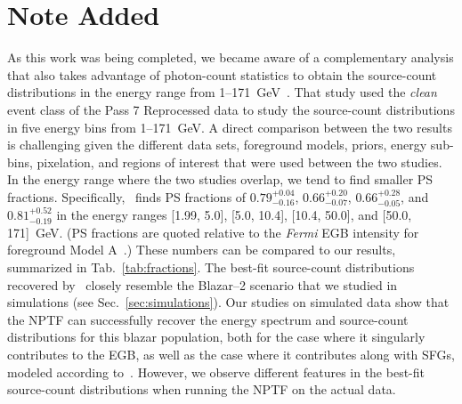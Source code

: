 \section*{Note Added}

As this work was being completed, we became aware of a complementary analysis that also takes advantage of photon-count statistics to obtain the source-count distributions in the energy range from 1--171~GeV~\cite{Zechlin:2016pme}.  That study used the {\it clean} event class of the Pass 7 Reprocessed data to study the source-count distributions in five energy bins from 1--171~GeV.  A direct comparison between the two results is challenging given the different data sets, foreground models, priors, energy sub-bins, pixelation, and regions of interest that were used between the two studies.  In the energy range where the two studies overlap, we tend to find smaller PS fractions.   %
Specifically,~\cite{Zechlin:2016pme} finds PS fractions of  $0.79_{-0.16}^{+0.04}$, $0.66_{-0.07}^{+0.20}$, $0.66_{-0.05}^{+0.28}$, and $0.81_{-0.19}^{+0.52}$ in the energy ranges [1.99, 5.0], [5.0, 10.4], [10.4, 50.0], and [50.0, 171]~GeV.  (PS fractions are quoted relative to the \emph{Fermi} EGB intensity for foreground Model A~\cite{Ackermann:2014usa}.)  These numbers can be compared to our results, summarized in Tab.~\ref{tab:fractions}.  The best-fit source-count distributions recovered by~\cite{Zechlin:2016pme} closely resemble the Blazar--2 scenario that we studied in simulations (see Sec.~\ref{sec:simulations}).  Our studies on simulated data show that the NPTF can successfully recover the energy spectrum and source-count distributions for this blazar population, both for the case where it singularly contributes to the EGB, as well as the case where it contributes along with SFGs, modeled according to~\cite{Tamborra:2014xia}.  However, we observe different features in the best-fit source-count distributions when running the NPTF on the actual data.  







